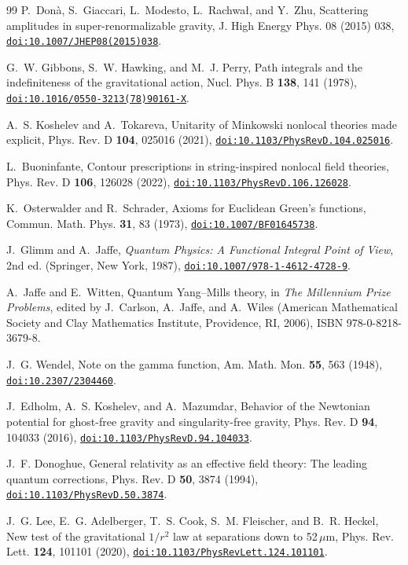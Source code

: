 \documentclass[a4paper,11pt]{article}
\newcommand{\doilink}[1]{\href{https://doi.org/#1}{\nolinkurl{doi:#1}}}
\begin{document}
\begin{thebibliography}{99}
P.~Don\`a, S.~Giaccari, L.~Modesto, L.~Rachwa{\l}, and Y.~Zhu, Scattering amplitudes in super-renormalizable gravity, J. High Energy Phys. 08 (2015) 038, \doilink{10.1007/JHEP08(2015)038}.

G.~W. Gibbons, S.~W. Hawking, and M.~J. Perry, Path integrals and the indefiniteness of the gravitational action, Nucl. Phys. B \textbf{138}, 141 (1978), \doilink{10.1016/0550-3213(78)90161-X}.

A.~S. Koshelev and A.~Tokareva, Unitarity of Minkowski nonlocal theories made explicit, Phys. Rev. D \textbf{104}, 025016 (2021), \doilink{10.1103/PhysRevD.104.025016}.

L.~Buoninfante, Contour prescriptions in string-inspired nonlocal field theories, Phys. Rev. D \textbf{106}, 126028 (2022), \doilink{10.1103/PhysRevD.106.126028}.

K.~Osterwalder and R.~Schrader, Axioms for Euclidean Green's functions, Commun. Math. Phys. \textbf{31}, 83 (1973), \doilink{10.1007/BF01645738}.

J.~Glimm and A.~Jaffe, \textit{Quantum Physics: A Functional Integral Point of View}, 2nd ed. (Springer, New York, 1987), \doilink{10.1007/978-1-4612-4728-9}.

A.~Jaffe and E.~Witten, Quantum Yang--Mills theory, in \textit{The Millennium Prize Problems}, edited by J.~Carlson, A.~Jaffe, and A.~Wiles (American Mathematical Society and Clay Mathematics Institute, Providence, RI, 2006), ISBN 978-0-8218-3679-8.

J.~G. Wendel, Note on the gamma function, Am. Math. Mon. \textbf{55}, 563 (1948), \doilink{10.2307/2304460}.

J.~Edholm, A.~S. Koshelev, and A.~Mazumdar, Behavior of the Newtonian potential for ghost-free gravity and singularity-free gravity, Phys. Rev. D \textbf{94}, 104033 (2016), \doilink{10.1103/PhysRevD.94.104033}.

J.~F. Donoghue, General relativity as an effective field theory: The leading quantum corrections, Phys. Rev. D \textbf{50}, 3874 (1994), \doilink{10.1103/PhysRevD.50.3874}.

J.~G. Lee, E.~G. Adelberger, T.~S. Cook, S.~M. Fleischer, and B.~R. Heckel, New test of the gravitational $1/r^2$ law at separations down to 52\,$\mu$m, Phys. Rev. Lett. \textbf{124}, 101101 (2020), \doilink{10.1103/PhysRevLett.124.101101}.


\end{thebibliography}
\end{document}
